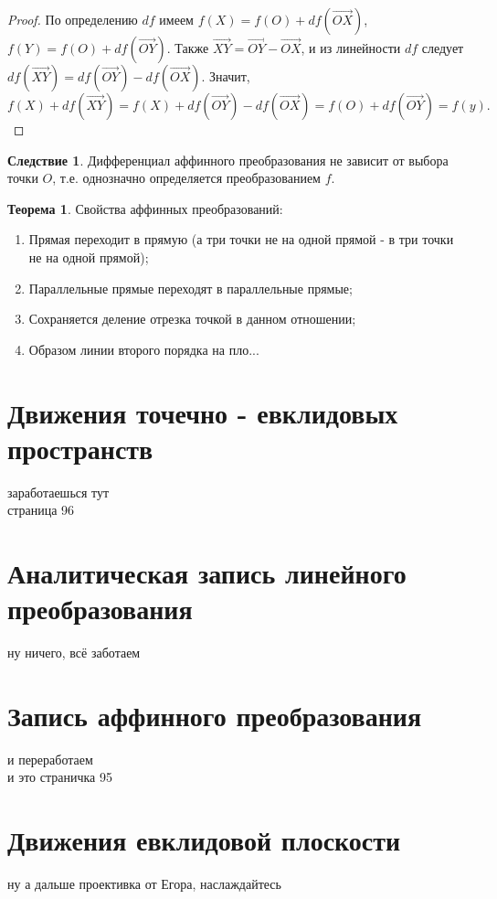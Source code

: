 \documentclass[a4paper, 12pt]{article}
\theoremstyle{definition}
\newtheorem*{theorem}{Теорема}
\newtheorem*{consequense}{Следствие}
\begin{document}
\begin{proof}
	По определению $df$ имеем $f(X) = f(O) + df(\overrightarrow{OX})$, $f(Y) = f(O) + df(\overrightarrow{OY})$. Также $\overrightarrow{XY} = \overrightarrow{OY} - \overrightarrow{OX}$, и из линейности $df$ следует $df(\overrightarrow{XY}) = df(\overrightarrow{OY}) - df(\overrightarrow{OX})$. Значит, 
	$$f(X) + df(\overrightarrow{XY}) = f(X) + df(\overrightarrow{OY}) - df(\overrightarrow{OX}) = f(O) + df(\overrightarrow{OY}) = f(y).$$
\end{proof}
\begin{consequense}
	Дифференциал аффинного преобразования не зависит от выбора точки $O$, т.е. однозначно определяется преобразованием $f$.
\end{consequense}
\begin{theorem} Свойства аффинных преобразований:
	\begin{enumerate}
		\item Прямая переходит в прямую (а три точки не на одной прямой - в три точки не на одной прямой);
		\item Параллельные прямые переходят в параллельные прямые;
		\item Сохраняется деление отрезка точкой в данном отношении;
		\item Образом линии второго порядка на пло...
	\end{enumerate}
\end{theorem}
\section{Движения точечно - евклидовых пространств}
заработаешься тут\\
страница 96

\section{Аналитическая запись линейного преобразования}
ну ничего, всё заботаем

\section{Запись аффинного преобразования}
и переработаем\\
и это страничка 95

\section{Движения евклидовой плоскости}
ну а дальше проективка от Егора, наслаждайтесь
\end{document}
